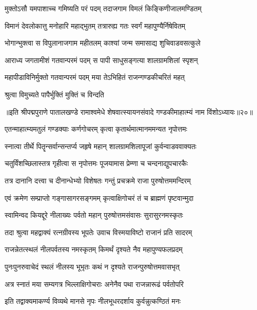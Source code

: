 \twolineshloka
{मुक्तोऽसौ यमपाशाच्च गमिष्यति परं पदम्}
{तदाजगाम विमलं किङ्किणीजालमण्डितम्}%

\twolineshloka
{विमानं देवलोकात्तु मनोहारि महाद्भुतम्}
{तत्रारुह्य गतः स्वर्गं महापुण्यैर्निषेवितम्}%

\twolineshloka
{भोगान्भुक्त्वा स विपुलानाजगाम महीतलम्}
{काश्यां जन्म समासाद्य शुचिवाडवसत्कुले}%

\twolineshloka
{आराध्य जगतामीशं गतवान्परमं पदम्}
{स पापी साधुसङ्गत्या शालग्रामशिलां स्पृशन्}%

\twolineshloka
{महापीडाविनिर्मुक्तो गतवान्परमं पदम्}
{मया तेऽभिहितं राजन्गण्डकीचरितं महत्}%

\onelineshloka
{श्रुत्वा विमुच्यते पापैर्भुक्तिं मुक्तिं च विन्दति}%

{॥इति श्रीपद्मपुराणे पातालखण्डे रामाश्वमेधे शेषवात्स्यायनसंवादे गण्डकीमाहात्म्यं नाम विंशोऽध्यायः॥२०॥}



\twolineshloka
{एतन्माहात्म्यमतुलं गण्डक्याः कर्णगोचरम्}
{कृत्वा कृतार्थमात्मानममन्यत नृपोत्तमः}%

\twolineshloka
{स्नात्वा तीर्थे पितॄन्सर्वान्सन्तर्प्य जहृषे महान्}
{शालग्रामशिलापूजां कुर्वन्वाडववाक्यतः}%

\twolineshloka
{चतुर्विंशच्छिलास्तत्र गृहीत्वा स नृपोत्तमः}
{पूजयामास प्रेम्णा च चन्दनाद्युपचारकैः}%

\twolineshloka
{तत्र दानानि दत्त्वा च दीनान्धेभ्यो विशेषतः}
{गन्तुं प्रचक्रमे राजा पुरुषोत्तममन्दिरम्}%

\twolineshloka
{एवं क्रमेण सम्प्राप्तो गङ्गासागरसङ्गमम्}
{कृत्वाक्षिगोचरं तं च ब्राह्मणं पृष्टवान्मुदा}%

\twolineshloka
{स्वामिन्वद कियद्दूरे नीलाख्यः पर्वतो महान्}
{पुरुषोत्तमसंवासः सुरासुरनमस्कृतः}%

\twolineshloka
{तदा श्रुत्वा महद्वाक्यं रत्नग्रीवस्य भूपतेः}
{उवाच विस्मयाविष्टो राजानं प्रति सादरम्}%

\twolineshloka
{राजन्नेतत्स्थलं नीलपर्वतस्य नमस्कृतम्}
{किमर्थं दृश्यते नैव महापुण्यफलप्रदम्}%

\twolineshloka
{पुनःपुनरुवाचेदं स्थलं नीलस्य भूभृतः}
{कथं न दृश्यते राजन्पुरुषोत्तमवासभृत्}%

\twolineshloka
{अत्र स्नातं मया सम्यगत्र भिल्लाक्षिगोचराः}
{अनेनैव पथा राजन्नारूढं पर्वतोपरि}%

\twolineshloka
{इति तद्वाक्यमाकर्ण्य विव्यथे मानसे नृपः}
{नीलभूधरदर्शाय कुर्वन्नुत्कण्ठितं मनः}%

